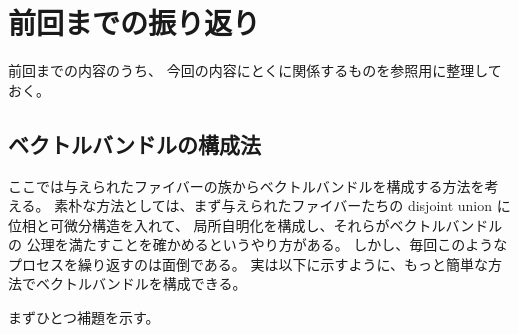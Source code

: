 \documentclass[report]{jlreq}
\begin{document}
%
\newpage
\appendix

%
\chapter{前回までの振り返り}

前回までの内容のうち、
今回の内容にとくに関係するものを参照用に整理しておく。

%
\section{ベクトルバンドルの構成法}

ここでは与えられたファイバーの族からベクトルバンドルを構成する方法を考える。
素朴な方法としては、まず与えられたファイバーたちの
disjoint union に位相と可微分構造を入れて、
局所自明化を構成し、それらがベクトルバンドルの
公理を満たすことを確かめるというやり方がある。
しかし、毎回このようなプロセスを繰り返すのは面倒である。
実は以下に示すように、もっと簡単な方法でベクトルバンドルを構成できる。

まずひとつ補題を示す。
\end{document}
